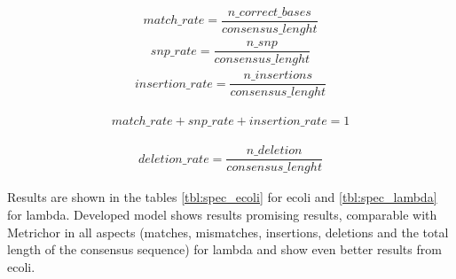 \documentclass[times, utf8, diplomski, numeric, english]{fer}
\begin{document}
\begin{equation}
\begin{gathered}
match\_rate = \dfrac{n\_correct\_bases}{consensus\_lenght}
\end{gathered}
\end{equation}
\begin{equation}
\begin{gathered}
snp\_rate = \dfrac{n\_snp}{consensus\_lenght}
\end{gathered}
\end{equation}
\begin{equation}
\begin{gathered}
insertion\_rate = \dfrac{n\_insertions}{consensus\_lenght}
\end{gathered}
\end{equation}

\begin{equation}
\begin{gathered}
match\_rate  + snp\_rate + insertion\_rate = 1
\end{gathered}
\end{equation}


\begin{equation}
\begin{gathered}
deletion\_rate = \dfrac{n\_deletion}{consensus\_lenght}
\end{gathered}
\end{equation}

Results are shown in the tables \ref{tbl:spec_ecoli}  for ecoli and \ref{tbl:spec_lambda} for lambda. 
Developed model shows results promising results, comparable with Metrichor in all aspects (matches, mismatches, insertions, deletions and the total length of the consensus sequence) for lambda and show even better results from ecoli. 
\end{document}
